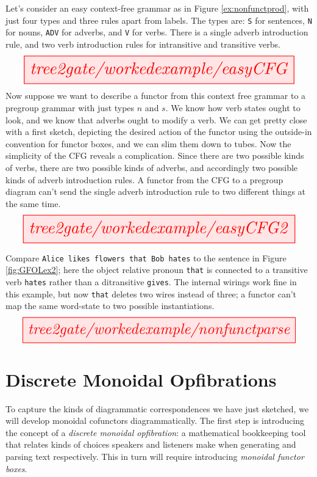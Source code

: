 \begin{example}\label{ex:nonfunctprod}
Let's consider an easy context-free grammar as in Figure \ref{ex:nonfunctprod}, with just four types and three rules apart from labels. The types are: \texttt{S} for sentences, \texttt{N} for nouns, \texttt{ADV} for adverbs, and \texttt{V} for verbs. There is a single adverb introduction rule, and two verb introduction rules for intransitive and transitive verbs.
\[\resizebox{\textwidth}{!}{\tikzfig{tree2gate/workedexample/easyCFG}}\]
Now suppose we want to describe a functor from this context free grammar to a pregroup grammar with just types $n$ and $s$. We know how verb states ought to look, and we know that adverbs ought to modify a verb. We can get pretty close with a first sketch, depicting the desired action of the functor using the outside-in convention for functor boxes, and we can slim them down to tubes. Now the simplicity of the CFG reveals a complication. Since there are two possible kinds of verbs, there are two possible kinds of adverbs, and accordingly two possible kinds of adverb introduction rules. A functor from the CFG to a pregroup diagram can't send the single adverb introduction rule to two different things at the same time.
\[\resizebox{\textwidth}{!}{\tikzfig{tree2gate/workedexample/easyCFG2}}\]
\end{example}

\begin{example}\label{ex:nonfunctparse}
Compare \texttt{Alice likes flowers that Bob hates} to the sentence in Figure \ref{fig:GFOLex2}; here the object relative pronoun \texttt{that} is connected to a transitive verb \texttt{hates} rather than a ditransitive \texttt{gives}. The internal wirings work fine in this example, but now \texttt{that} deletes two wires instead of three; a functor can't map the same word-state to two possible instantiations.
\[\resizebox{\textwidth}{!}{\tikzfig{tree2gate/workedexample/nonfunctparse}}\]
\end{example}

\clearpage

\section{Discrete Monoidal Opfibrations}

To capture the kinds of diagrammatic correspondences we have just sketched, we will develop monoidal cofunctors diagrammatically. The first step is introducing the concept of a \emph{discrete monoidal opfibration}: a mathematical bookkeeping tool that relates kinds of choices speakers and listeners make when generating and parsing text respectively. This in turn will require introducing \emph{monoidal functor boxes}.

